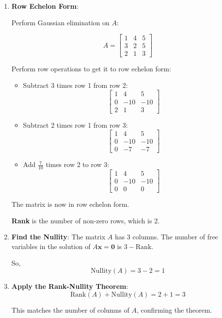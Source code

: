\documentclass[
  letterpaper,
  DIV=11,
  numbers=noendperiod]{scrreprt}
\theoremstyle{plain}
\theoremstyle{definition}
\theoremstyle{remark}
\begin{document}
\begin{enumerate}
\def\labelenumi{\arabic{enumi}.}
\item
  \textbf{Row Echelon Form}:

  Perform Gaussian elimination on \(A\):

  \[A = \begin{bmatrix} 1 & 4 & 5 \\  3 & 2 & 5 \\   2 & 1 & 3   \end{bmatrix}\]

  Perform row operations to get it to row echelon form:

  \begin{itemize}
  \item
    Subtract 3 times row 1 from row 2:
    \[\begin{bmatrix}     1 & 4 & 5 \\     0 & -10 & -10 \\     2 & 1 & 3     \end{bmatrix}\]
  \item
    Subtract 2 times row 1 from row 3:
    \[\begin{bmatrix}     1 & 4 & 5 \\     0 & -10 & -10 \\     0 & -7 & -7     \end{bmatrix}\]
  \item
    Add \(\frac{7}{10}\) times row 2 to row 3:
    \[\begin{bmatrix}     1 & 4 & 5 \\     0 & -10 & -10 \\     0 & 0 & 0     \end{bmatrix}\]
  \end{itemize}

  The matrix is now in row echelon form.

  \textbf{Rank} is the number of non-zero rows, which is 2.
\item
  \textbf{Find the Nullity}: The matrix \(A\) has 3 columns. The number
  of free variables in the solution of \(A \mathbf{x} = \mathbf{0}\) is
  \(3 - \text{Rank}\).

  So, \[\text{Nullity}(A) = 3 - 2 = 1\]
\item
  \textbf{Apply the Rank-Nullity Theorem}:
  \[\text{Rank}(A) + \text{Nullity}(A) = 2 + 1 = 3\]

  This matches the number of columns of \(A\), confirming the theorem.
\end{enumerate}
\end{document}

